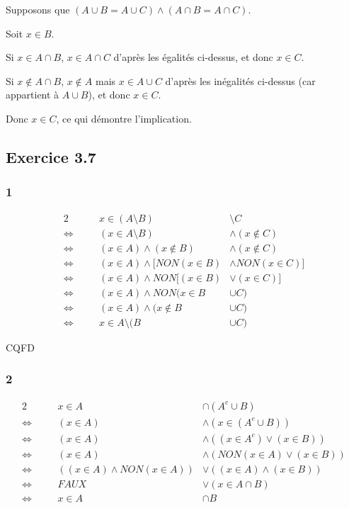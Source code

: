 \documentclass[a4paper,10pt]{report}
\begin{document}
Supposons que $(A \cup B = A \cup C) \wedge (A \cap B = A \cap C)$.

Soit $x \in B$.

Si $x \in A \cap B$, $x \in A \cap C$ d'après les égalités ci-dessus, et donc $x \in C$.

Si $x \notin A \cap B$, $x \notin A$ mais $x \in A \cup C$ d'après les inégalités ci-dessus (car appartient à $A \cup B$), et donc $x \in C$.

Donc $x \in C$, ce qui démontre l'implication.

\subsection*{Exercice 3.7}

\subsubsection*{1}
\begin{alignat*}{2}
	                    &\quad &               x \in (A \setminus B)&\setminus C  \\
	\Longleftrightarrow &      &       (x \in A \setminus B) &\wedge (x \notin C) \\
	\Longleftrightarrow &      &  (x \in A) \wedge (x \notin B) &\wedge (x \notin C)\\
	\Longleftrightarrow &      &  (x \in A) \wedge [NON(x \in B) &\wedge NON(x \in C)]\\
	\Longleftrightarrow &      &  (x \in A) \wedge NON[(x \in B) &\vee (x \in C)]\\
	\Longleftrightarrow &      &  (x \in A) \wedge NON(x \in B&\cup C)\\
	\Longleftrightarrow &      &  (x \in A) \wedge (x \notin B&\cup C)\\
    \Longleftrightarrow &      &  x \in A \setminus(B&\cup C)
\end{alignat*}

CQFD

\subsubsection*{2}
\begin{alignat*}{2}
	                    &\quad &               x \in A &\cap (A^c \cup B)  \\
	\Longleftrightarrow &      &  (x \in A) &\wedge (x \in (A^c \cup B))\\
	\Longleftrightarrow &      & (x \in A) &\wedge ( (x \in A^c) \vee (x \in B))  \\
	\Longleftrightarrow &      &  (x \in A) &\wedge ( NON(x \in A) \vee (x \in B))\\
	\Longleftrightarrow &      &  ((x \in A) \wedge NON(x \in A)) &\vee ((x \in A) \wedge (x \in B))\\
	\Longleftrightarrow &      &  FAUX &\vee (x \in A \cap B)\\
	\Longleftrightarrow &      &  x \in A &\cap B
\end{alignat*}
\end{document}
